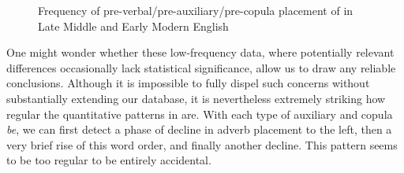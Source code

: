 \documentclass[output=paper]{langsci/langscibook}
\begin{document}
\begin{figure}
\caption{Frequency of pre-verbal/pre-auxiliary/pre-copula placement
of  in Late Middle and Early Modern English\label{fig:key:09.1}}
\pgfplotstablegetcolsof{\table}
\pgfmathtruncatemacro{}
\end{figure}

            

One might wonder whether these low-frequency data, where potentially relevant
differences occasionally lack statistical significance, allow us to draw any
reliable conclusions. Although it is impossible to fully dispel such concerns
without substantially extending our database, it is nevertheless extremely
striking how regular the quantitative patterns in  are. With
each type of auxiliary and copula \emph{be}, we can first detect a phase of
decline in adverb placement to the left, then a very brief rise of this word
order, and finally another decline. This pattern seems to be too regular to be
entirely accidental.
\end{document}
